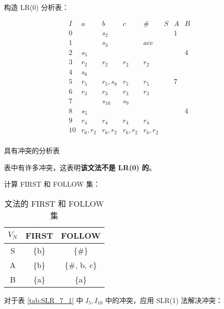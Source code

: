 \begin{enumerate}
    构造 LR(0) 分析表：
    
    \begin{table}[H]
        \centering
        \begin{equation*}
            \begin{array}{c|cccc|ccc}
                I & a & b & c & \# & S & A & B \\
                \hline
                0 & & s_2 & & & & 1 & \\
                1 & & s_3 & & acc & & & \\
                2 & s_5 & & & & & & 4 \\
                3 & r_2 & r_2 & r_2 & r_2 & & & \\
                4 & s_6 & & & & & & \\
                5 & r_5 & r_5, s_8 & r_5 & r_5 & & 7 & \\
                6 & r_3 & r_3 & r_3 & r_3 & & & \\
                7 & & s_{10} & s_9 & & & & \\
                8 & s_5 & & & & & & 4 \\
                9 & r_4 & r_4 & r_4 & r_4 & & & \\
                10 & r_6, r_2 & r_6, r_2 & r_6, r_2 & r_6, r_2 & & & \\
            \end{array}
        \end{equation*}
        \caption{具有冲突的分析表}
        \label{tab:SLR_7_1}
    \end{table}
    
    表中有许多冲突，这表明\textbf{该文法不是 LR(0) 的}。
    
    计算 FIRST 和 FOLLOW 集：
    
    \begin{table}[H]
        \centering
        \begin{tabular}{c|cc}
            $V_N$ & FIRST & FOLLOW \\
            \hline
            S & \{b\} & \{\#\} \\
            A & \{b\} & \{\#, b, c\} \\
            B & \{a\} & \{a\} \\
        \end{tabular}
        \caption{文法的 FIRST 和 FOLLOW 集}
        \label{tab:FF_7}
    \end{table}
    
    对于表 \ref{tab:SLR_7_1} 中 $I_5, I_{10}$ 中的冲突，应用 SLR(1) 法解决冲突：
    

\end{enumerate}
